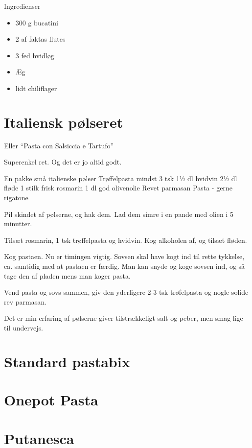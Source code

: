 \documentclass[
]{book}
\providecommand{\tightlist}{%
  \setlength{\itemsep}{0pt}\setlength{\parskip}{0pt}}
\begin{document}
Ingredienser

\begin{itemize}
\tightlist
\item
  300 g bucatini
\item
  2 af faktas flutes
\item
  3 fed hvidløg
\item
  Æg
\item
  lidt chiliflager
\end{itemize}

\section{Italiensk pølseret}\label{italiensk-puxf8lseret}

Eller ``Pasta con Salsiccia e Tartufo''

Superenkel ret. Og det er jo altid godt.

En pakke små italienske pølser
Trøffelpasta mindst 3 tsk
1½ dl hvidvin
2½ dl fløde
1 stilk frisk rosmarin
1 dl god olivenolie
Revet parmasan
Pasta - gerne rigatone

Pil skindet af pølserne, og hak dem. Lad dem simre i en pande med olien i 5 minutter.

Tilsæt rosmarin, 1 tsk trøffelpasta og hvidvin. Kog alkoholen af, og tilsæt fløden.

Kog pastaen. Nu er timingen vigtig. Sovsen skal have kogt ind til rette tykkelse, ca. samtidig med at pastaen er færdig. Man kan snyde og koge sovsen ind, og så tage den af pladen mens man koger pasta.

Vend pasta og sovs sammen, giv den yderligere 2-3 tsk trøfelpasta og nogle solide rev parmasan.

Det er min erfaring af pølserne giver tilstrækkeligt salt og peber, men smag lige til undervejs.

\section{Standard pastabix}\label{standard-pastabix}

\section{Onepot Pasta}\label{onepot-pasta}

\section{Putanesca}\label{putanesca}
\end{document}
